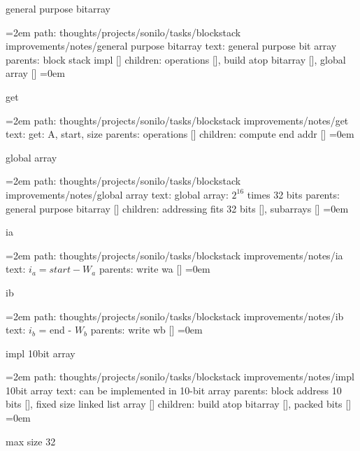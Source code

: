 \bigskip
{}
general purpose bitarray
\smallskip
\par\begingroup
\leftskip=2em
path: thoughts/projects/sonilo/tasks/blockstack improvements/notes/general purpose bitarray
\smallskip
text:  general purpose bit array
\smallskip
parents:  block stack impl []
\smallskip
children: operations [], build atop bitarray [], global array []
\smallskip
\leftskip=0em
\par\endgroup
\bigskip
{}
get
\smallskip
\par\begingroup
\leftskip=2em
path: thoughts/projects/sonilo/tasks/blockstack improvements/notes/get
\smallskip
text:  get: A, start, size
\smallskip
parents:  operations []
\smallskip
children: compute end addr []
\smallskip
\leftskip=0em
\par\endgroup
\bigskip
{}
global array
\smallskip
\par\begingroup
\leftskip=2em
path: thoughts/projects/sonilo/tasks/blockstack improvements/notes/global array
\smallskip
text:  global array: $2^16$ times 32 bits
\smallskip
parents:  general purpose bitarray []
\smallskip
children: addressing fits 32 bits [], subarrays []
\smallskip
\leftskip=0em
\par\endgroup
\bigskip
{}
ia
\smallskip
\par\begingroup
\leftskip=2em
path: thoughts/projects/sonilo/tasks/blockstack improvements/notes/ia
\smallskip
text:  $i_a = start - W_a$
\smallskip
parents:  write wa []
\smallskip
\leftskip=0em
\par\endgroup
\bigskip
{}
ib
\smallskip
\par\begingroup
\leftskip=2em
path: thoughts/projects/sonilo/tasks/blockstack improvements/notes/ib
\smallskip
text:  $i_b$ = end - $W_b$
\smallskip
parents:  write wb []
\smallskip
\leftskip=0em
\par\endgroup
\bigskip
{}
impl 10bit array
\smallskip
\par\begingroup
\leftskip=2em
path: thoughts/projects/sonilo/tasks/blockstack improvements/notes/impl 10bit array
\smallskip
text:  can be implemented in 10-bit array
\smallskip
parents:  block address 10 bits [], fixed size linked list array []
\smallskip
children: build atop bitarray [], packed bits []
\smallskip
\leftskip=0em
\par\endgroup
\bigskip
{}
max size 32
\smallskip
